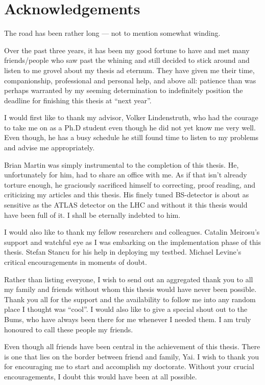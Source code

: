 %

\chapter{Acknowledgements}

The road has been rather long --- not to mention somewhat winding.

\medskip

Over the past three years, it has been my good fortune to have and met many friends/people who saw past the whining and still decided to stick around and listen to me grovel about my thesis ad eternum. They have given me their time, companionship, professional and
personal help, and above all: patience than was perhaps warranted by my
seeming determination to indefinitely position the deadline for
finishing this thesis at ``next year''.

I would first like to thank my advisor, Volker Lindenstruth, who had the courage to take me on as a Ph.D student even though he did not yet know me very well. Even though, he has a busy schedule he still found time to listen to my problems and advise me appropriately. 

Brian Martin was simply instrumental to the completion of this thesis. He, unfortunately for him, had to share an office with me. As if that isn't already torture enough, he graciously sacrificed himself to correcting, proof reading, and criticizing my articles and this thesis. His finely tuned BS-detector is about as sensitive as the ATLAS detector on the LHC and without it this thesis would have been full of it. I shall be eternally indebted to him.


I would also like to thank my fellow researchers and colleagues. Catalin Meirosu's support and watchful eye as I was embarking on the implementation phase of this thesis. Stefan Stancu for his help in deploying my testbed.  Michael Levine's critical encouragements in moments of doubt.  
%

Rather than listing everyone, I wish to send out an aggregated thank you to all my family and friends without whom this thesis would have never been possible. Thank you all for the support and the availability to follow me into any random place I thought was ``cool''. I would also like to give a special shout out to the Bums, who have always been there for me whenever I needed them. I am truly honoured to call these people my friends.

Even though all friends have been central in the achievement of this thesis. There is one that lies on the border between friend and family, Yai. I wish to thank you for encouraging me to start and accomplish my doctorate. Without your crucial encouragements, I doubt this would have been at all possible.

